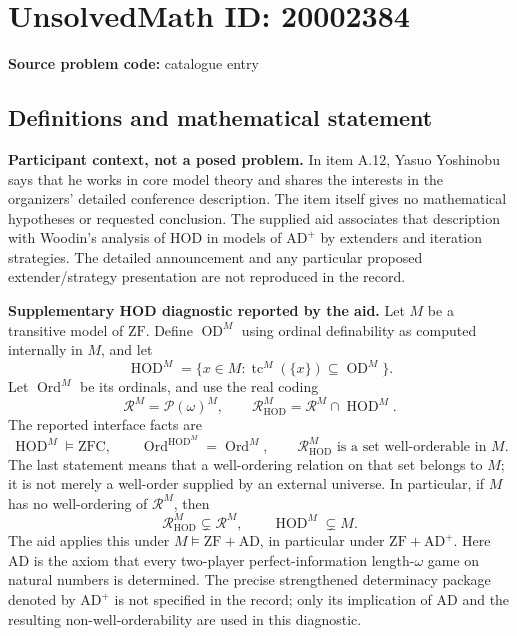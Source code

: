 \documentclass[11pt]{article}
\begin{document}
\section*{UnsolvedMath ID: 20002384}
\textbf{Source problem code:} catalogue entry
\subsection{Definitions and mathematical statement}
\textbf{Participant context, not a posed problem.} In item A.12, Yasuo Yoshinobu says that he works in core model theory and shares the interests in the organizers' detailed conference description. The item itself gives no mathematical hypotheses or requested conclusion. The supplied aid associates that description with Woodin's analysis of HOD in models of \(\mathrm{AD}^{+}\) by extenders and iteration strategies. The detailed announcement and any particular proposed extender/strategy presentation are not reproduced in the record.

\textbf{Supplementary HOD diagnostic reported by the aid.} Let \(M\) be a transitive model of \(\mathrm{ZF}\). Define \(\operatorname{OD}^M\) using ordinal definability as computed internally in \(M\), and let
\[
 \operatorname{HOD}^M=
 \{x\in M:\operatorname{tc}^M(\{x\})\subseteq\operatorname{OD}^M\}.
\]
Let \(\operatorname{Ord}^M\) be its ordinals, and use the real coding
\[
 \mathcal R^M=\mathcal P(\omega)^M,\qquad
 \mathcal R_{\operatorname{HOD}}^M=
 \mathcal R^M\cap\operatorname{HOD}^M.
\]
The reported interface facts are
\[
 \operatorname{HOD}^M\models\mathrm{ZFC},\qquad
 \operatorname{Ord}^{\operatorname{HOD}^M}=\operatorname{Ord}^M,
 \qquad \mathcal R_{\operatorname{HOD}}^M
 \text{ is a set well-orderable in }M.
\]
The last statement means that a well-ordering relation on that set belongs to \(M\); it is not merely a well-order supplied by an external universe. In particular, if \(M\) has no well-ordering of \(\mathcal R^M\), then
\[
 \mathcal R_{\operatorname{HOD}}^M\subsetneq\mathcal R^M,
 \qquad \operatorname{HOD}^M\subsetneq M.
\]
The aid applies this under \(M\models\mathrm{ZF}+\mathrm{AD}\), in particular under \(\mathrm{ZF}+\mathrm{AD}^{+}\). Here \(\mathrm{AD}\) is the axiom that every two-player perfect-information length-\(\omega\) game on natural numbers is determined. The precise strengthened determinacy package denoted by \(\mathrm{AD}^{+}\) is not specified in the record; only its implication of \(\mathrm{AD}\) and the resulting non-well-orderability are used in this diagnostic.
\end{document}
